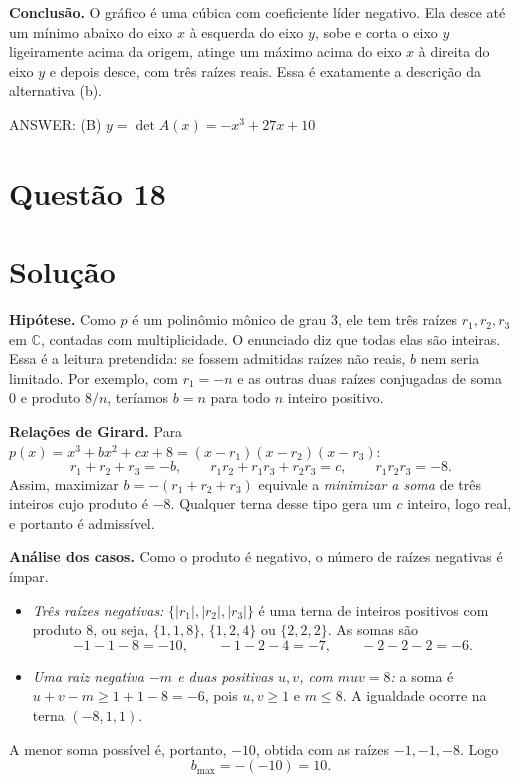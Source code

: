 \documentclass{article}%
\begin{document}
\textbf{Conclusão.} O gráfico é uma cúbica com coeficiente líder negativo. Ela desce até um mínimo abaixo do eixo $x$ à esquerda do eixo $y$, sobe e corta o eixo $y$ ligeiramente acima da origem, atinge um máximo acima do eixo $x$ à direita do eixo $y$ e depois desce, com três raízes reais. Essa é exatamente a descrição da alternativa (b).

ANSWER: (B) $y=\det A(x)=-x^3+27x+10$%
\newpage%
\section*{Questão 18}

\section*{Solução}

\textbf{Hipótese.} Como $p$ é um polinômio mônico de grau 3, ele tem três raízes $r_1, r_2, r_3$ em $\mathbb{C}$, contadas com multiplicidade. O enunciado diz que todas elas são inteiras. Essa é a leitura pretendida: se fossem admitidas raízes não reais, $b$ nem seria limitado. Por exemplo, com $r_1=-n$ e as outras duas raízes conjugadas de soma $0$ e produto $8/n$, teríamos $b=n$ para todo $n$ inteiro positivo.

\textbf{Relações de Girard.} Para $p(x)=x^3+bx^2+cx+8=(x-r_1)(x-r_2)(x-r_3)$:
\[
r_1+r_2+r_3=-b, \qquad r_1r_2+r_1r_3+r_2r_3=c, \qquad r_1r_2r_3=-8 .
\]
Assim, maximizar $b=-(r_1+r_2+r_3)$ equivale a \emph{minimizar a soma} de três inteiros cujo produto é $-8$. Qualquer terna desse tipo gera um $c$ inteiro, logo real, e portanto é admissível.

\textbf{Análise dos casos.} Como o produto é negativo, o número de raízes negativas é ímpar.

\begin{itemize}
\item \emph{Três raízes negativas:} $\{|r_1|,|r_2|,|r_3|\}$ é uma terna de inteiros positivos com produto $8$, ou seja, $\{1,1,8\}$, $\{1,2,4\}$ ou $\{2,2,2\}$. As somas são
\[
-1-1-8=-10,\qquad -1-2-4=-7,\qquad -2-2-2=-6 .
\]
\item \emph{Uma raiz negativa $-m$ e duas positivas $u, v$, com $muv=8$:} a soma é $u+v-m\ge 1+1-8=-6$, pois $u,v\ge 1$ e $m\le 8$. A igualdade ocorre na terna $(-8,1,1)$.
\end{itemize}

A menor soma possível é, portanto, $-10$, obtida com as raízes $-1,-1,-8$. Logo
\[
b_{\max}=-(-10)=10 .
\]
\end{document}
